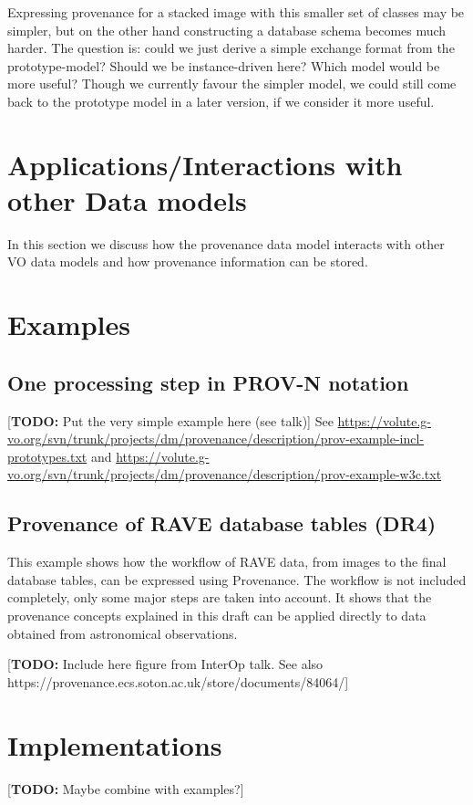 \documentclass[11pt,a4paper]{ivoa}
\newcommand{\TODO}[1]{\noindent \textcolor{todocolor}{[\textbf{TODO:} #1]}}
\begin{document}
Expressing provenance for a stacked image with this smaller set of classes may be simpler, but on the other hand constructing a database schema becomes much harder. 
The question is: could we just derive a simple exchange format from the prototype-model? Should we be instance-driven here? Which model would be more useful?
Though we currently favour the simpler model, we could still come back to the prototype model in a later version, if we consider it more useful.


\section{Applications/Interactions with other Data models}
In this section we discuss how the provenance data model interacts with
other VO data models and how provenance information can be stored.



\section{Examples}\label{sec:examples}

\subsection{One processing step in PROV-N notation}
\TODO{Put the very simple example here (see talk)}
See \url{https://volute.g-vo.org/svn/trunk/projects/dm/provenance/description/prov-example-incl-prototypes.txt}
and \url{https://volute.g-vo.org/svn/trunk/projects/dm/provenance/description/prov-example-w3c.txt}


\subsection{Provenance of RAVE database tables (DR4)}
This example shows how the workflow of RAVE data, from images to the final database tables, can be expressed using Provenance. 
The workflow is not included completely, only some major steps are taken into account. It shows that the provenance concepts explained in this draft can be applied directly to data obtained from astronomical observations.

\TODO{Include here figure from InterOp talk. See also https://provenance.ecs.soton.ac.uk/store/documents/84064/}



\section{Implementations}
\TODO{Maybe combine with examples?}
\end{document}
